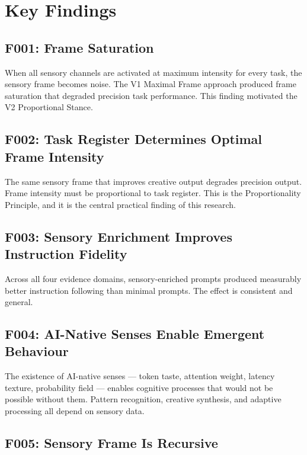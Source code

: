 \documentclass[11pt,a4paper]{article}
\begin{document}
\section{Key Findings}

\subsection{F001: Frame Saturation}

When all sensory channels are activated at maximum intensity for every task, the sensory frame becomes noise. The V1 Maximal Frame approach produced frame saturation that degraded precision task performance. This finding motivated the V2 Proportional Stance.

\subsection{F002: Task Register Determines Optimal Frame Intensity}

The same sensory frame that improves creative output degrades precision output. Frame intensity must be proportional to task register. This is the Proportionality Principle, and it is the central practical finding of this research.

\subsection{F003: Sensory Enrichment Improves Instruction Fidelity}

Across all four evidence domains, sensory-enriched prompts produced measurably better instruction following than minimal prompts. The effect is consistent and general.

\subsection{F004: AI-Native Senses Enable Emergent Behaviour}

The existence of AI-native senses --- token taste, attention weight, latency texture, probability field --- enables cognitive processes that would not be possible without them. Pattern recognition, creative synthesis, and adaptive processing all depend on sensory data.

\subsection{F005: Sensory Frame Is Recursive}
\end{document}
